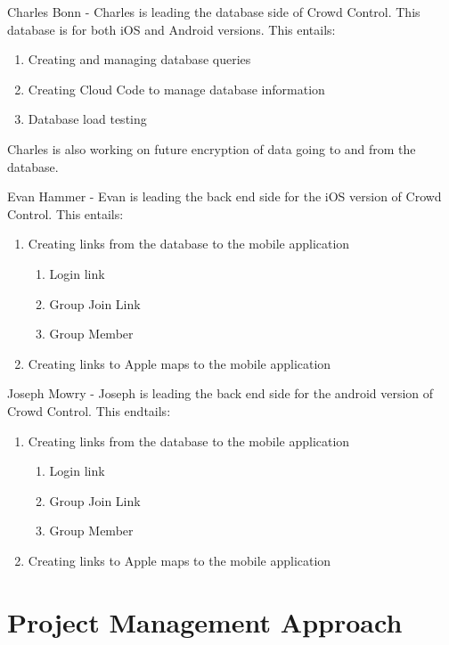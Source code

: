 Charles Bonn - Charles is leading the database side of Crowd Control. This database is for both iOS and Android versions. This entails:
	\begin{enumerate}
	\item Creating and managing database queries 
	\item Creating Cloud Code to manage database information
	\item Database load testing
	\end{enumerate}
Charles is also working on future encryption of data going to and from the database.
\newline

Evan Hammer - Evan is leading the back end side for the iOS version of Crowd Control. This entails:
	\begin{enumerate}
	\item Creating links from the database to the mobile application
		\begin{enumerate}
		\item Login link
		\item Group Join Link
		\item Group Member
		\end{enumerate}
	\item Creating links to Apple maps to the mobile application
	\end{enumerate}

Joseph Mowry - Joseph is leading the back end side for the android version of Crowd Control. This endtails:

	\begin{enumerate}
	\item Creating links from the database to the mobile application
		\begin{enumerate}
		\item Login link
		\item Group Join Link
		\item Group Member
		\end{enumerate}
	\item Creating links to Apple maps to the mobile application
	\end{enumerate}



\section{Project  Management Approach}

